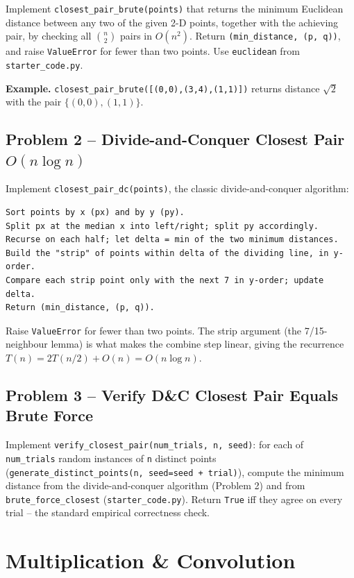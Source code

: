 \documentclass[11pt]{article}
\begin{document}
Implement \texttt{closest\_pair\_brute(points)} that returns the minimum Euclidean distance
between any two of the given 2-D points, together with the achieving pair, by checking all
$\binom{n}{2}$ pairs in $O(n^2)$. Return \texttt{(min\_distance, (p, q))}, and raise
\texttt{ValueError} for fewer than two points. Use \texttt{euclidean} from
\texttt{starter\_code.py}.

\textbf{Example.} \texttt{closest\_pair\_brute([(0,0),(3,4),(1,1)])} returns distance
$\sqrt 2$ with the pair $\{(0,0),(1,1)\}$.

\subsection*{Problem 2 -- Divide-and-Conquer Closest Pair $O(n \log n)$}

Implement \texttt{closest\_pair\_dc(points)}, the classic divide-and-conquer algorithm:
\begin{verbatim}
Sort points by x (px) and by y (py).
Split px at the median x into left/right; split py accordingly.
Recurse on each half; let delta = min of the two minimum distances.
Build the "strip" of points within delta of the dividing line, in y-order.
Compare each strip point only with the next 7 in y-order; update delta.
Return (min_distance, (p, q)).
\end{verbatim}
Raise \texttt{ValueError} for fewer than two points. The strip argument (the 7/15-neighbour
lemma) is what makes the combine step linear, giving the recurrence $T(n) = 2T(n/2) + O(n) =
O(n \log n)$.

\subsection*{Problem 3 -- Verify D\&C Closest Pair Equals Brute Force}

Implement \texttt{verify\_closest\_pair(num\_trials, n, seed)}: for each of
\texttt{num\_trials} random instances of \texttt{n} distinct points
(\texttt{generate\_distinct\_points(n, seed=seed + trial)}), compute the minimum distance from
the divide-and-conquer algorithm (Problem 2) and from \texttt{brute\_force\_closest}
(\texttt{starter\_code.py}). Return \texttt{True} iff they agree on every trial -- the
standard empirical correctness check.

\newpage
\section{Multiplication \& Convolution}
\end{document}
